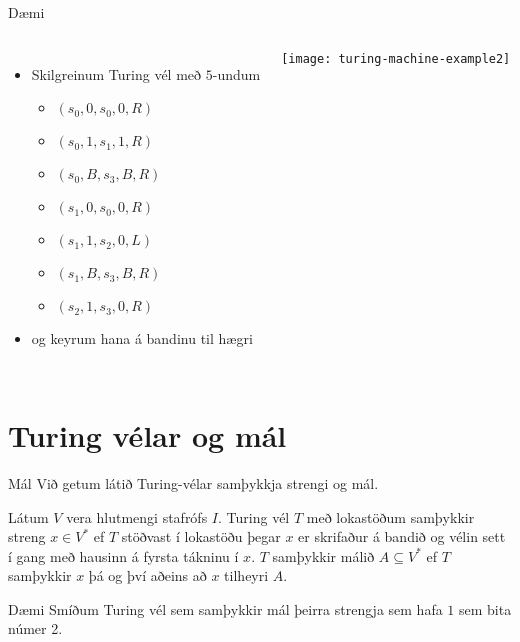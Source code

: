 \documentclass[handout]{beamer}
\begin{document}
\begin{frame}{Dæmi}
\begin{columns}
\begin{itemize}
 \item Skilgreinum Turing vél með $5$-undum
 \begin{itemize}
  \item $(s_0 , 0, s_0 , 0, R)$
  \item $(s_0 , 1, s_1 , 1, R)$
  \item $(s_0 , B, s_3 , B, R)$
  \item $(s_1 , 0, s_0 , 0, R)$
  \item $(s_1 , 1, s_2 , 0, L)$
  \item $(s_1 , B, s_3 , B, R)$
  \item $(s_2 , 1, s_3 , 0, R)$
 \end{itemize}
 \item og keyrum hana á bandinu til hægri
\end{itemize}
\begin{center}
\texttt{[image: turing-machine-example2]}
\end{center}
\end{columns}
\end{frame}

\section{Turing vélar og mál}

\begin{frame}{Mál}
Við getum látið Turing-vélar samþykkja strengi og mál.

\begin{tcolorbox}
Látum $V$ vera hlutmengi stafrófs $I$. Turing vél $T$ með lokastöðum samþykkir streng $x \in V^*$ ef $T$ stöðvast í lokastöðu þegar $x$ er skrifaður á bandið og vélin sett í gang með hausinn á fyrsta tákninu í $x$. $T$ samþykkir málið $A \subseteq V^*$ ef $T$ samþykkir $x$ þá og því aðeins að $x$ tilheyri $A$.
\end{tcolorbox}

\end{frame}

\begin{frame}{Dæmi}
Smíðum Turing vél sem samþykkir mál þeirra strengja sem hafa $1$ sem bita númer 2.
\begin{center}
\end{center}
\end{frame}
\end{document}
